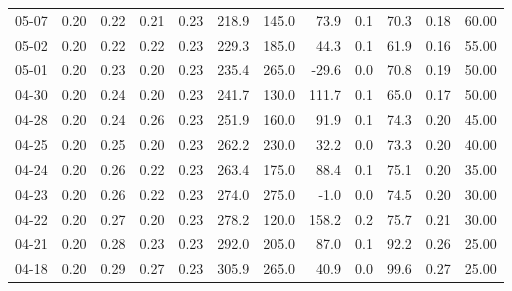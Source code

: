 \begin{threeparttable}
{\begin{tabular}{lrrrrrrrrrrr}
  05-07 &          0.20 &          0.22 &          0.21 &        0.23 &               218.9 &               145.0 &       73.9 &                 0.1 &             70.3 &            0.18 &                  60.00 \\
  05-02 &          0.20 &          0.22 &          0.22 &        0.23 &               229.3 &               185.0 &       44.3 &                 0.1 &             61.9 &            0.16 &                  55.00 \\
  05-01 &          0.20 &          0.23 &          0.20 &        0.23 &               235.4 &               265.0 &      -29.6 &                 0.0 &             70.8 &            0.19 &                  50.00 \\
  04-30 &          0.20 &          0.24 &          0.20 &        0.23 &               241.7 &               130.0 &      111.7 &                 0.1 &             65.0 &            0.17 &                  50.00 \\
  04-28 &          0.20 &          0.24 &          0.26 &        0.23 &               251.9 &               160.0 &       91.9 &                 0.1 &             74.3 &            0.20 &                  45.00 \\
  04-25 &          0.20 &          0.25 &          0.20 &        0.23 &               262.2 &               230.0 &       32.2 &                 0.0 &             73.3 &            0.20 &                  40.00 \\
  04-24 &          0.20 &          0.26 &          0.22 &        0.23 &               263.4 &               175.0 &       88.4 &                 0.1 &             75.1 &            0.20 &                  35.00 \\
  04-23 &          0.20 &          0.26 &          0.22 &        0.23 &               274.0 &               275.0 &       -1.0 &                 0.0 &             74.5 &            0.20 &                  30.00 \\
  04-22 &          0.20 &          0.27 &          0.20 &        0.23 &               278.2 &               120.0 &      158.2 &                 0.2 &             75.7 &            0.21 &                  30.00 \\
  04-21 &          0.20 &          0.28 &          0.23 &        0.23 &               292.0 &               205.0 &       87.0 &                 0.1 &             92.2 &            0.26 &                  25.00 \\
  04-18 &          0.20 &          0.29 &          0.27 &        0.23 &               305.9 &               265.0 &       40.9 &                 0.0 &             99.6 &            0.27 &                  25.00 \\

\end{tabular}}
\end{threeparttable}
